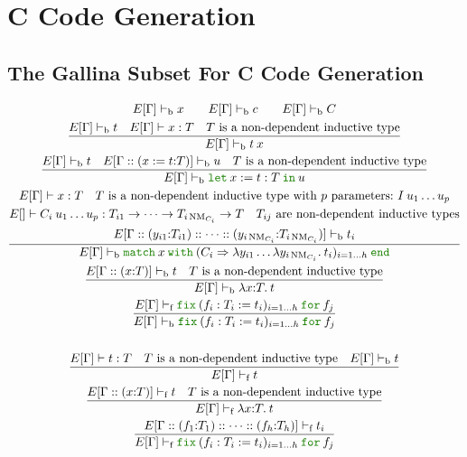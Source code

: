 \documentclass[a4paper,fleqn]{article}
\def\gallina{\textrm{Gallina}}
\newcommand{\kwlet}{\mbox{\color{mygreen}\ttfamily let}}
\newcommand{\kwin}{\mbox{\color{mygreen}\ttfamily in}}
\newcommand{\kwmatch}{\mbox{\color{mygreen}\ttfamily match}}
\newcommand{\kwwith}{\mbox{\color{mygreen}\ttfamily with}}
\newcommand{\kwend}{\mbox{\color{mygreen}\ttfamily end}}
\newcommand{\kwfix}{\mbox{\color{mygreen}\ttfamily fix}}
\newcommand{\kwfor}{\mbox{\color{mygreen}\ttfamily for}}
\newcommand{\lamT}[3]{\lambda #1\mathord{:}#2.\:#3}
\newcommand{\lamB}[1]{\lambda #1.\:}
\newcommand{\lassum}[2]{(#1\mathord{:}#2)}
\newcommand{\ldef}[3]{(#1:=#2\mathord{:}#3)}
\newcommand{\letin}[3]{\kwlet\:#1:=#2\:\kwin\:#3}
\newcommand{\match}[4]{\kwmatch\:#1\:\kwwith\:(#2 \Rightarrow #3)_{#4}\:\kwend}
\newcommand{\fix}[4]{\kwfix\:(#1 := #2)_{#3}\:\kwfor\:#4}
\DeclareMathOperator{\NM}{NM} %
\newcommand{\vdashb}{\vdash_{\textrm{b}}}
\newcommand{\vdashf}{\vdash_{\textrm{f}}}
\begin{document}
\section{C Code Generation}\label{sec:c-code-gen}
\subsection{The \gallina{} Subset For C Code Generation}\label{sec:gallinasubsetforcgen}
\begin{gather*}
  E[\Gamma] \vdashb x \qquad
  E[\Gamma] \vdashb c \qquad
  E[\Gamma] \vdashb C \\
  \dfrac{
    E[\Gamma] \vdashb t \quad
    E[\Gamma] \vdash x : T \quad
    \text{$T$ is a non-dependent inductive type}
  }{
    E[\Gamma] \vdashb t\:x
  } \\
  \dfrac{
    E[\Gamma] \vdashb t \quad
    E[\Gamma::\ldef{x}{t}{T}] \vdashb u \quad
    \text{$T$ is a non-dependent inductive type}
  }{
    E[\Gamma] \vdashb \letin{x}{t:T}{u}
  } \\
  \dfrac{
    \begin{gathered}
      E[\Gamma] \vdash x:T \quad
      \text{$T$ is a non-dependent inductive type with $p$ parameters:}~I\:u_1\ldots u_p \\
      E[] \vdash C_i\:u_1\ldots u_p: T_{i1} \rightarrow \dotsb \rightarrow T_{i\NM_{C_i}} \rightarrow T \quad
      \text{$T_{ij}$ are non-dependent inductive types} \\
      E[\Gamma::\lassum{y_{i1}}{T_{i1}}::\dotsb::\lassum{y_{i\NM_{C_i}}}{T_{i\NM_{C_i}}}] \vdashb t_i
    \end{gathered}
  }{
    E[\Gamma] \vdashb \match{x}{C_i}{\lambda y_{i1}\ldots\lamB{y_{i\NM_{C_i}}}t_i}{i=1\ldots h}
  } \\
  \dfrac{
    E[\Gamma::\lassum{x}{T}] \vdashb t \quad
    \text{$T$ is a non-dependent inductive type}
  }{
    E[\Gamma] \vdashb \lamT{x}{T}{t}
  } \\
  \dfrac{
    E[\Gamma] \vdashf \fix{f_i:T_i}{t_i}{i=1\ldots h}{f_j}
  }{
    E[\Gamma] \vdashb \fix{f_i:T_i}{t_i}{i=1\ldots h}{f_j}
  } \\
  \\
  \dfrac{
    E[\Gamma] \vdash t : T \quad
    \text{$T$ is a non-dependent inductive type} \quad
    E[\Gamma] \vdashb t
  }{
    E[\Gamma] \vdashf t
  } \\
  \dfrac{
    E[\Gamma::\lassum{x}{T}] \vdashf t \quad
    \text{$T$ is a non-dependent inductive type}
  }{
    E[\Gamma] \vdashf \lamT{x}{T}{t}
  } \\
  \dfrac{
    E[\Gamma::\lassum{f_1}{T_1}::\dotsb::\lassum{f_h}{T_h}] \vdashf t_i
  }{
    E[\Gamma] \vdashf \fix{f_i:T_i}{t_i}{i=1\ldots h}{f_j}
  }
\end{gather*}
\end{document}
